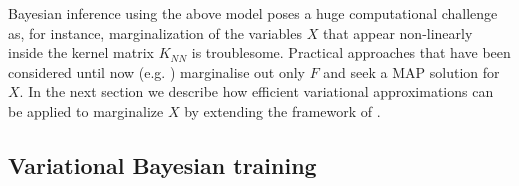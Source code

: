 \documentclass{article} %
\begin{document}
Bayesian inference using the above model poses a huge 
computational challenge as, for instance, marginalization 
of the variables $X$ that appear non-linearly inside the kernel 
matrix $K_{NN}$ is troublesome. Practical approaches that have been considered until now
(e.g. \cite{hgplvm, GPDM}) marginalise out only $F$ and seek a MAP solution 
for $X$.
%
 In the next section we describe how efficient variational 
approximations can be applied to marginalize $X$ by extending the 
framework of \cite{BayesianGPLVM}.

\subsection{Variational Bayesian training} 
\end{document}
